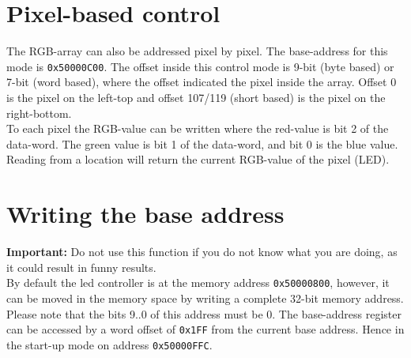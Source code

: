 \documentclass[a4paper,twoside,12pt]{article}
\begin{document}
\section{Pixel-based control}
The RGB-array can also be addressed pixel by pixel. The base-address for this mode is \texttt{0x50000C00}. The offset inside this control mode is 9-bit (byte based) or 7-bit (word based), where the offset indicated the pixel inside the array. Offset 0 is the pixel on the left-top and offset 107/119 (short based) is the pixel on the right-bottom.\\
To each pixel the RGB-value can be written where the red-value is bit 2 of the data-word. The green value is bit 1 of the data-word, and bit 0 is the blue value. Reading from a location will return the current RGB-value of the pixel (LED).
\section{Writing the base address}
\textbf{Important:} Do not use this function if you do not know what you are doing, as it could result in funny results.\\
By default the led controller is at the memory address \texttt{0x50000800}, however, it can be moved in the memory space by writing a complete 32-bit memory address. Please note
that the bits 9..0 of this address must be 0. The base-address register can be accessed by a word offset of \texttt{0x1FF} from the current base address. Hence in the start-up mode on address \texttt{0x50000FFC}.
\end{document}
